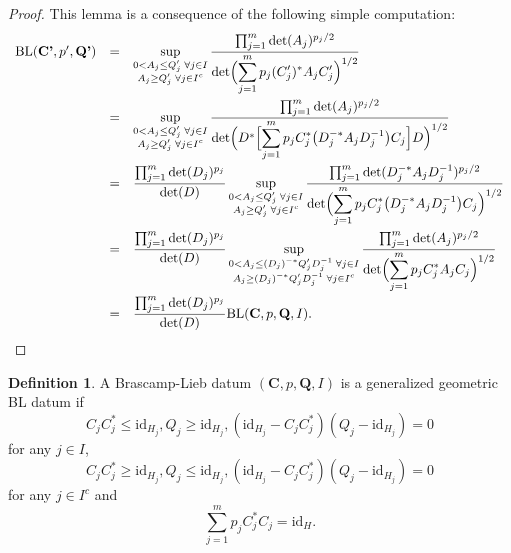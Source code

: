 \documentclass[11pt,a4paper,reqno]{amsart}
\numberwithin{equation}{section}
\theoremstyle{definition}
\newtheorem{definition}[theorem]{Definition}
\newcommand{\nm}{\noalign{\smallskip}}
\newcommand{\ds}{\displaystyle}
\newcommand{\<}{\ensuremath \leq}
\renewcommand{\>}{\ensuremath \geq}
\begin{document}
\begin{proof}
    This lemma is a consequence of the following simple computation: $$\begin{array}{lll}
    \mathrm{BL}(\textbf{C'},p',\textbf{Q'}) &=& \ds \sup_{\substack{0<A_j \leq Q_j' \; \forall j \in I \\ A_j \ge Q_j' \; \forall j \in I^c}}\frac{\prod_{j=1}^m \det(A_j)^{p_j/2}}{\det \Bigl(\ds \sum_{j=1}^m p_j(C_j')^*A_jC_j'\Bigl)^{1/2}} \\
    \nm 
    &=& \ds \sup_{\substack{0<A_j \leq Q_j' \; \forall j \in I \\ A_j \ge Q_j' \; \forall j \in I^c}}\frac{\prod_{j=1}^m \det(A_j)^{p_j/2}}{\det \Bigl(D^* \Bigl[\ds \sum_{j=1}^m p_jC_j^*\bigl(D_j^{-*}A_jD_j^{-1} \bigl)C_j \Bigl] D\Bigl)^{1/2}} \\
    \nm 
    &=& \ds \frac{\prod_{j=1}^m \det(D_j)^{p_j}}{\det(D)} \sup_{\substack{0<A_j \leq Q_j' \; \forall j \in I \\ A_j \ge Q_j' \; \forall j \in I^c}} \frac{\prod_{j=1}^m \det(D_j^{-*}A_jD_j^{-1})^{p_j/2}}{\det \Bigl(\ds \sum_{j=1}^m p_jC_j^*\bigl(D_j^{-*}A_jD_j^{-1} \bigl)C_j\Bigl)^{1/2}}
    \\
    \nm 
    &=& \ds \frac{\prod_{j=1}^m \det(D_j)^{p_j}}{\det(D)} \sup_{\substack{0<A_j \leq (D_j)^{-*}Q_j'D_j^{-1} \; \forall j \in I \\ A_j \ge (D_j)^{-*}Q_j'D_j^{-1} \; \forall j \in I^c}} \frac{\prod_{j=1}^m \det(A_j)^{p_j/2}}{\det \Bigl(\ds \sum_{j=1}^m p_jC_j^*A_jC_j\Bigl)^{1/2}} \\
    \nm 
    &=& \ds \frac{\prod_{j=1}^m \det(D_j)^{p_j}}{\det(D)} \mathrm{BL}(\textbf{C},p,\textbf{Q},I).
    \end{array}$$
\end{proof}

\begin{definition}
    A Brascamp-Lieb datum $(\textbf{C},p,\textbf{Q},I)$ is a generalized geometric BL datum if $$C_jC_j^* \leq \mathrm{id}_{H_j}, Q_j \geq \mathrm{id}_{H_j}, (\mathrm{id}_{H_j}-C_jC_j^*)(Q_j-\mathrm{id}_{H_j})=0$$ for any $j \in I$, $$C_jC_j^* \geq \mathrm{id}_{H_j}, Q_j \leq \mathrm{id}_{H_j}, (\mathrm{id}_{H_j}-C_jC_j^*)(Q_j-\mathrm{id}_{H_j})=0$$ for any $j \in I^c$ and \begin{equation} \label{GGeometric_BL_datum} \sum_{j=1}^m p_jC_j^*C_j=\mathrm{id}_H.\end{equation}
\end{definition}
\end{document}
